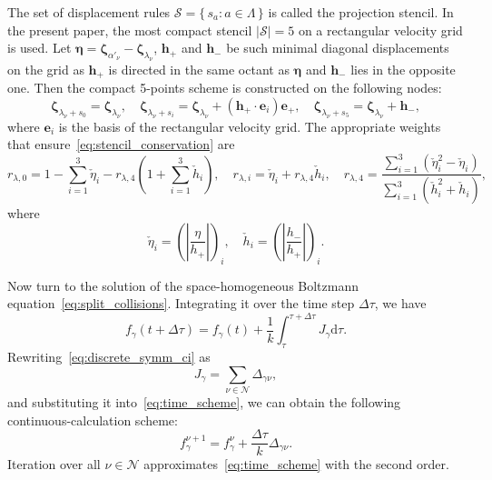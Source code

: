 \documentclass[final]{jfm} %
\newcommand{\dd}{\mathrm{d}}
\newcommand{\bzeta}{\boldsymbol{\zeta}}
\newcommand{\bh}{\boldsymbol{h}}
\newcommand{\Nu}{\mathcal{N}}
\newcommand{\Set}[2]{\{\,{#1}:{#2}\,\}}
\begin{document}
The set of displacement rules \(\mathcal{S} = \Set{s_a}{a\in\Lambda}\)
is called the projection stencil.
In the present paper, the most compact stencil \(|\mathcal{S}|=5\) on a rectangular velocity grid is used.
Let \(\boldsymbol{\eta} = \bzeta_{\alpha'_\nu} - \bzeta_{\lambda_\nu}\),
\(\bh_+\) and \(\bh_-\) be such minimal diagonal displacements on the grid
as \(\bh_+\) is directed in the same octant as \(\boldsymbol{\eta}\)
and \(\bh_-\) lies in the opposite one.
Then the compact 5-points scheme is constructed on the following nodes:
\begin{equation}\label{eq:stencil_nodes}
    \bzeta_{\lambda_\nu+s_0} = \bzeta_{\lambda_\nu}, \quad
    \bzeta_{\lambda_\nu+s_i} = \bzeta_{\lambda_\nu} + (\bh_+\cdot \boldsymbol{e}_i)\boldsymbol{e}_+, \quad
    \bzeta_{\lambda_\nu+s_5} = \bzeta_{\lambda_\nu} + \bh_-,
\end{equation}
where \(\boldsymbol{e}_i\) is the basis of the rectangular velocity grid.
The appropriate weights that ensure~\eqref{eq:stencil_conservation} are
\begin{equation}\label{eq:stencil_weights}
    r_{\lambda,0} = 1 - \sum_{i=1}^3 \check{\eta}_i - r_{\lambda,4}\left(1+\sum_{i=1}^3 \check{h}_i\right), \quad
    r_{\lambda,i} = \check{\eta}_i + r_{\lambda,4}\check{h}_i, \quad
    r_{\lambda,4} = \frac{\displaystyle\sum_{i=1}^3(\check{\eta}_i^2 - \check{\eta}_i)}
        {\displaystyle\sum_{i=1}^3(\check{h}_i^2 + \check{h}_i)},
\end{equation}
where
\begin{equation}\label{eq:stencil_variables}
    \check{\eta}_i = \left(\left|\frac{\eta}{h_+}\right|\right)_i, \quad
    \check{h}_i = \left(\left|\frac{h_-}{h_+}\right|\right)_i.
\end{equation}

Now turn to the solution of the space-homogeneous Boltzmann equation~\eqref{eq:split_collisions}.
Integrating it over the time step \(\Delta\tau\), we have
\begin{equation}\label{eq:time_scheme}
    f_\gamma(t+\Delta\tau) = f_\gamma(t) + \frac1k \int_\tau^{\tau+\Delta\tau} J_\gamma \dd\tau.
\end{equation}
Rewriting~\eqref{eq:discrete_symm_ci} as
\begin{equation}\label{eq:discrete_short_ci}
    J_\gamma = \sum_{\nu\in\Nu} \Delta_{\gamma\nu},
\end{equation}
and substituting it into~\eqref{eq:time_scheme},
we can obtain the following continuous-calculation scheme:
\begin{equation}\label{eq:continuous_scheme}
    f_\gamma^{\nu+1} = f_\gamma^\nu + \frac{\Delta\tau}{k}\Delta_{\gamma\nu}.
\end{equation}
Iteration over all \(\nu\in\Nu\) approximates~\eqref{eq:time_scheme}
with the second order.
\end{document}
